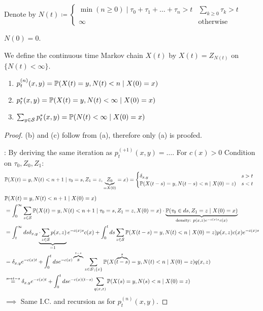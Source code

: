 Denote by \(N(t)\coloneqq \begin{cases}
    \min(n\geq 0)\mid \tau_0+\tau_1+\dots+\tau_n>t & \sum_{k\geq 0}\tau_k>t \\
    \infty & \text{otherwise}
\end{cases}\)

\(N(0)=0\). 
\begin{definition}\label{def:1.22}
    We define the continuous time Markov chain \(X(t)\) by 
    \(X(t)=Z_{N(t)}\) on \(\{N(t)<\infty\}\).
\end{definition}

\begin{proposition}\label{prop:1.23}
    \begin{enumerate}
        \item[(a)] \(p_t^{(n)}(x,y)=\mathbb{P}(X(t)=y,N(t)<n\mid X(0)=x)\)
        \item[(b)] \(p_t^*(x,y)=\mathbb{P}(X(t)=y,N(t)<\infty\mid X(0)=x)\)
        \item[(c)] \(\sum_{y\in\mathcal{S}}p_t^*(x,y)=\mathbb{P}(N(t)<\infty\mid X(0)=x)\)
    \end{enumerate}
\end{proposition}


\begin{proof}
    (b) and (c) follow from (a), therefore only (a) is proofed.

    : By deriving the same iteration as \(p_t^{(+1)}(x,y)=\dots\).
    For \(c(x)>0\)
    Condition on \(\tau_0,Z_0,Z_1:\)
    \begin{align*}
        \mathbb{P}(X(t)=y,N(t)<n+1\mid \tau_0=s,Z_1=z,\underbrace{Z_0}_{=X(0)}=x) &=\begin{cases}
            \delta_{x,y}& s>t\\
            \mathbb{P}(X(t-s)=y,N(t-s)<n\mid X(0)=z) & s < t
        \end{cases}
    \end{align*}
    \begin{align*}
        &\mathbb{P}(X(t)=y,N(t)<n+1\mid X(0)=x) \\
        &= \int_0^\infty \sum_{z\in \mathcal{S}} \mathbb{P}(X(t)=y,N(t)<n+1\mid \tau_0=s,Z_1=z,X(0)=x)\cdot \underbrace{\mathbb{P}(\tau_0\in ds,Z_1=z\mid X(0)=x)}_{\text{density: }p(x,z)e^{-c(x)s}c(x)}\\
        &=\int_t^\infty ds \delta_{x,y}\underbrace{\cdot\sum_{z\in \mathcal{S}} p(x,z)}_{=1}e^{-c(x)s}c(x)+\int_0^tds \sum_{z\in\mathcal{S}}\mathbb{P}(X(t-s)=y,N(t)<n\mid X(0)=z)p(x,z)c(x)e^{-c(x)s}\\
        &=\delta_{x,y}e^{-c(x)t}+\int_0^t ds e^{-c(x)\overbrace{s}^{t-s}}\sum_{z\in\mathcal{S}\setminus\{x\}} \mathbb{P}(X(\overbrace{t-s}^{s})=y,N(t)<n\mid X(0)=z)q(x,z)\\
        &\stackrel{s\mapsto t-s}{=}\delta_{x,y}e^{-c(x)t}+\int_0^t ds e^{-c(x)(t-s)}\sum_{q(x,z)}\mathbb{P}(X(s)=y,N(s)<n\mid X(0)=z)
    \end{align*}
    \(\implies\) Same I.C. and recursion as for \(p_t^{(n)}(x,y)\). 
\end{proof}

